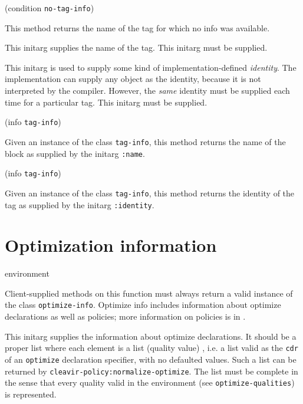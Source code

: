  {(condition {\tt no-tag-info})}

This method returns the name of the tag for which no info was
available. 



This initarg supplies the name of the tag.  This initarg must be
supplied.


This initarg is used to supply some kind of implementation-defined 
\emph{identity}.  The implementation can supply any object as the
identity, because it is not interpreted by the compiler.  However, the
\emph{same} identity must be supplied each time for a particular
tag.  This initarg must be supplied. 

 {(info {\tt tag-info})}

Given an instance of the class \texttt{tag-info}, this method
returns the name of the block as supplied by the initarg
\texttt{:name}.

 {(info {\tt tag-info})}

Given an instance of the class \texttt{tag-info}, this method
returns the identity of the tag as supplied by the initarg
\texttt{:identity}.

\section{Optimization information}

 {environment}

Client-supplied methods on this function must always return a valid
instance of the class \texttt{optimize-info}. Optimize info includes
information about optimize declarations as well as policies; more
information on policies is in .



This initarg supplies the information about optimize declarations.
It should be a proper list where each element is a list (quality
value) , i.e. a list valid as the \texttt{cdr} of an \texttt{optimize} 
declaration specifier, with no defaulted values. Such a list can be
returned by \texttt{cleavir-policy:normalize-optimize}. The list
must be complete in the sense that every quality valid in
 the environment (see \texttt{optimize-qualities}) is represented.

